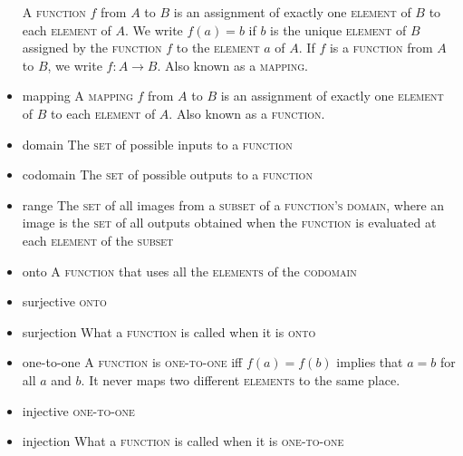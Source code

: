 \documentclass{article}
\newcommand{\term}[1]{\textsc{#1}}
\begin{document}
\begin{itemize}
  \subitem A \term{function} $f$ from $A$ to $B$ is an assignment of exactly one \term{element} of $B$ to each \term{element} of $A$. We write $f(a) = b$ if $b$ is the unique \term{element} of $B$ assigned by the \term{function} $f$ to the \term{element} $a$ of $A$. If $f$ is a \term{function} from $A$ to $B$, we write $f \colon A \to B$. Also known as a \term{mapping}.
\item mapping
  \subitem A \term{mapping} $f$ from $A$ to $B$ is an assignment of exactly one \term{element} of $B$ to each \term{element} of $A$. Also known as a \term{function}.
\item domain
   \subitem The \term{set} of possible inputs to a \term{function}
\item codomain
   \subitem The \term{set} of possible outputs to a \term{function}
\item range
   \subitem The \term{set} of all images from a \term{subset} of a \term{function's} \term{domain}, where an image is the \term{set} of all outputs obtained when the \term{function} is evaluated at each \term{element} of the \term{subset}
\item onto
   \subitem A \term{function} that uses all the \term{elements} of the \term{codomain}
\item surjective
   \subitem \term{onto}
\item surjection
   \subitem What a \term{function} is called when it is \term{onto}
\item one-to-one
   \subitem A \term{function} is \term{one-to-one} iff $f(a) = f(b)$ implies that $a = b$ for all $a$ and $b$. It never maps two different \term{elements} to the same place.
\item injective
   \subitem \term{one-to-one}
\item injection
   \subitem What a \term{function} is called when it is \term{one-to-one}
\end{itemize}
\end{document}
